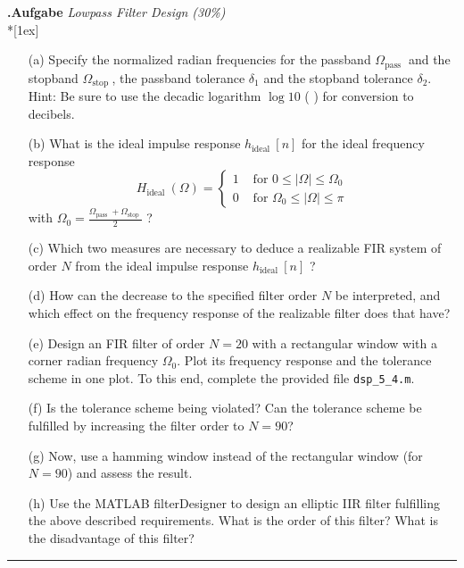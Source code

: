 \documentclass[12pt,a4paper,austrian]{article}
\newcounter{theaufgabe}\setcounter{theaufgabe}{1}
\newenvironment{aufgabe}[1]%
{\bigskip\par\noindent\begin{nopagebreak}
                          \textsf{\textbf{\arabic{theaufgabe}.\thinspace Aufgabe}}\quad
                          \textsf{\textit{#1}}\\*[1ex]%
                          \stepcounter{theaufgabe}\hspace{2ex}
\end{nopagebreak}}
{\par\pagebreak[2]}
\begin{document}
\begin{aufgabe}{Lowpass Filter Design (30\%)}
        \begin{enumerate}
            \item[(a)]  Specify the normalized radian frequencies for the passband $\Omega_{\text {pass }}$
            and the stopband $\Omega_{\text {stop }}$, the passband tolerance $\delta_{1}$ and the stopband tolerance $\delta_{2}$.
            Hint: Be sure to use the decadic logarithm $\log 10$ ( ) for conversion to decibels.
            \item[(b)]  What is the ideal impulse response $h_{\text {ideal }}[n]$ for the ideal frequency response
            $$
            H_{\text {ideal }}(\Omega)= \begin{cases}
                                            1 & \text { for } 0 \leq|\Omega| \leq \Omega_{0} \\ 0 & \text { for } \Omega_{0} \leq|\Omega| \leq \pi
            \end{cases}
            $$
            with $\Omega_{0}=\frac{\Omega_{\text {pass }}+\Omega_{\text {stop }}}{2}$ ?
            \item[(c)]  Which two measures are necessary to deduce a realizable FIR system of order $N$ from the ideal impulse response $h_{\text {ideal }}[n]$ ?
            \item[(d)]  How can the decrease to the specified filter order $N$ be interpreted, and which effect on the frequency response of the realizable filter does that have?
            \item[(e)]  Design an FIR filter of order $N=20$ with a rectangular window with a corner radian frequency $\Omega_{0}$.
            Plot its frequency response and the tolerance scheme in one plot.
            To this end, complete the provided file \texttt{dsp\_5\_4.m}.
            \item[(f)]  Is the tolerance scheme being violated?
            Can the tolerance scheme be fulfilled by increasing the filter order to $N=90$?
            \item[(g)]  Now, use a hamming window instead of the rectangular window (for $N=90$) and assess the result.
            \item[(h)]  Use the MATLAB filterDesigner to design an elliptic IIR filter fulfilling the above described requirements.
            What is the order of this filter? What is the disadvantage of this filter?
        \end{enumerate}

        \hrule

        \begin{enumerate}
            
            
            
            
            
            
            
            
        \end{enumerate}

    \end{aufgabe}
\end{document}
